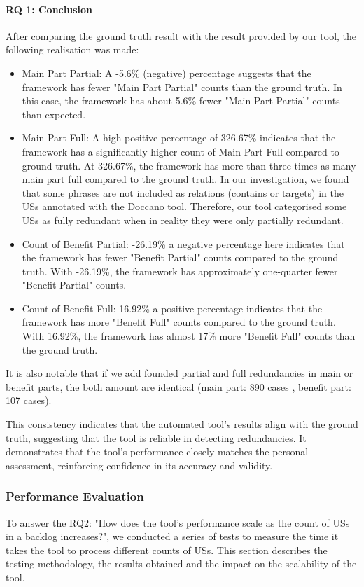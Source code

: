\paragraph{RQ 1: Conclusion}
After comparing the ground truth result with the result provided by our tool, the following realisation was made:
\begin{itemize}
	\item Main Part Partial: A -5.6\% (negative) percentage suggests that the framework has fewer "Main Part Partial" counts than the ground truth.
	In this case, the framework has about 5.6\% fewer "Main Part Partial" counts than expected.
	
	\item Main Part Full: A high positive percentage of 326.67\% indicates that the framework has a significantly higher count of Main Part Full compared to ground truth.
	At 326.67\%, the framework has more than three times as many main part full compared to the ground truth.
	In our investigation, we found that some phrases are not included as relations (contains or targets) in the USs annotated with the Doccano tool. Therefore, our tool categorised some USs as fully redundant when in reality they were only partially redundant.
	
	\item Count of Benefit Partial: -26.19\% a negative percentage here indicates that the framework has fewer "Benefit Partial" counts compared to the ground truth.
	With -26.19\%, the framework has approximately one-quarter fewer "Benefit Partial" counts.
	
	\item Count of Benefit Full: 16.92\% a positive percentage indicates that the framework has more "Benefit Full" counts compared to the ground truth.
	With 16.92\%, the framework has almost 17\% more "Benefit Full" counts than the ground truth.
\end{itemize}
It is also notable that if we add founded partial and full redundancies in main or benefit parts, the both amount are identical (main part: 890 cases , benefit part: 107 cases).

This consistency indicates that the automated tool's results align with the ground truth, suggesting that the tool is reliable in detecting redundancies. It demonstrates that the tool's performance closely matches the personal assessment, reinforcing confidence in its accuracy and validity.
\subsubsection*{Performance Evaluation}
To answer the RQ2: "How does the tool's performance scale as the count of USs in a backlog increases?", we conducted a series of tests to measure the time it takes the tool to process different counts of USs. This section describes the testing methodology, the results obtained and the impact on the scalability of the tool.
